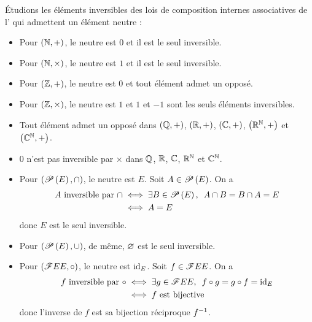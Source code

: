 \begin{ex}
Étudions les éléments inversibles des lois de composition internes associatives de l' qui admettent un élément neutre :

\begin{itemize}
\item Pour \(\paren{\N,+}\), le neutre est \(0\) et il est le seul inversible. \\

\item Pour \(\paren{\N,\times}\), le neutre est \(1\) et il est le seul inversible. \\

\item Pour \(\paren{\Z,+}\), le neutre est \(0\) et tout élément admet un opposé. \\

\item Pour \(\paren{\Z,\times}\), le neutre est \(1\) et \(1\) et \(-1\) sont les seuls éléments inversibles. \\

\item Tout élément admet un opposé dans \(\paren{\Q,+}\), \(\paren{\R,+}\), \(\paren{\C,+}\), \(\paren{\R^\N,+}\) et \(\paren{\C^\N,+}\). \\

\item \(0\) n'est pas inversible par \(\times\) dans \(\Q\), \(\R\), \(\C\), \(\R^\N\) et \(\C^\N\). \\

\item Pour \(\paren{\P{E},\inter}\), le neutre est \(E\). Soit \(A\in\P{E}\). On a \[\begin{aligned}
A\text{ inversible par }\inter&\ssi\quantifs{\exists B\in\P{E}}A\inter B=B\inter A=E \\
&\ssi A=E
\end{aligned}\] donc \(E\) est le seul inversible. \\

\item Pour \(\paren{\P{E},\union}\), de même, \(\ensvide\) est le seul inversible. \\

\item Pour \(\paren{\F{E}{E},\rond}\), le neutre est \(\id{E}\). Soit \(f\in\F{E}{E}\). On a \[\begin{aligned}
f\text{ inversible par }\rond&\ssi\quantifs{\exists g\in\F{E}{E}}f\rond g=g\rond f=\id{E} \\
&\ssi f\text{ est bijective}
\end{aligned}\] donc l'inverse de \(f\) est sa bijection réciproque \(f\inv\). \\
\end{itemize}
\end{ex}

